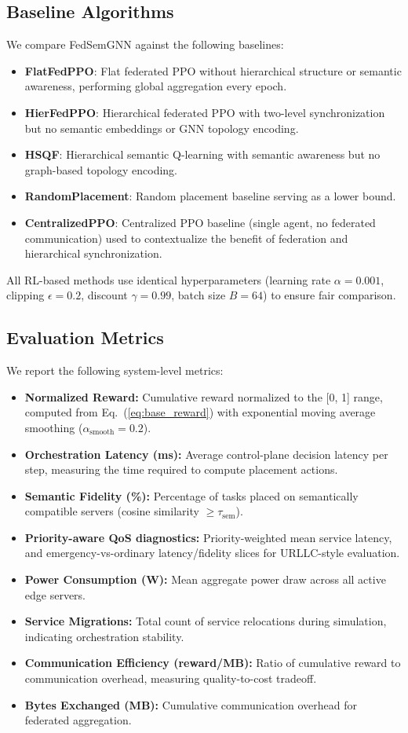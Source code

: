 \documentclass[conference]{IEEEtran}
\begin{document}
	\subsection{Baseline Algorithms}
	We compare FedSemGNN against the following baselines:
	
	\begin{itemize}
		\item \textbf{FlatFedPPO}: Flat federated PPO without hierarchical structure or semantic awareness, performing global aggregation every epoch.
		\item \textbf{HierFedPPO}: Hierarchical federated PPO with two-level synchronization but no semantic embeddings or GNN topology encoding.
		\item \textbf{HSQF}: Hierarchical semantic Q-learning with semantic awareness but no graph-based topology encoding.
		\item \textbf{RandomPlacement}: Random placement baseline serving as a lower bound.
		\item \textbf{CentralizedPPO}: Centralized PPO baseline (single agent, no federated communication) used to contextualize the benefit of federation and hierarchical synchronization.
	\end{itemize}
	
	All RL-based methods use identical hyperparameters (learning rate $\alpha = 0.001$, clipping $\epsilon = 0.2$, discount $\gamma = 0.99$, batch size $B = 64$) to ensure fair comparison.
	
	\subsection{Evaluation Metrics}
	We report the following system-level metrics:
	\begin{itemize}
		\item \textbf{Normalized Reward:} Cumulative reward normalized to the [0, 1] range, computed from Eq.~(\ref{eq:base_reward}) with exponential moving average smoothing ($\alpha_{\text{smooth}} = 0.2$).
		\item \textbf{Orchestration Latency (ms):} Average control-plane decision latency per step, measuring the time required to compute placement actions.
		\item \textbf{Semantic Fidelity (\%):} Percentage of tasks placed on semantically compatible servers (cosine similarity $\geq \tau_{\text{sem}}$).
		\item \textbf{Priority-aware QoS diagnostics:} Priority-weighted mean service latency, and emergency-vs-ordinary latency/fidelity slices for URLLC-style evaluation.
		\item \textbf{Power Consumption (W):} Mean aggregate power draw across all active edge servers.
		\item \textbf{Service Migrations:} Total count of service relocations during simulation, indicating orchestration stability.
		\item \textbf{Communication Efficiency (reward/MB):} Ratio of cumulative reward to communication overhead, measuring quality-to-cost tradeoff.
		\item \textbf{Bytes Exchanged (MB):} Cumulative communication overhead for federated aggregation.
	\end{itemize}
	
\end{document}
